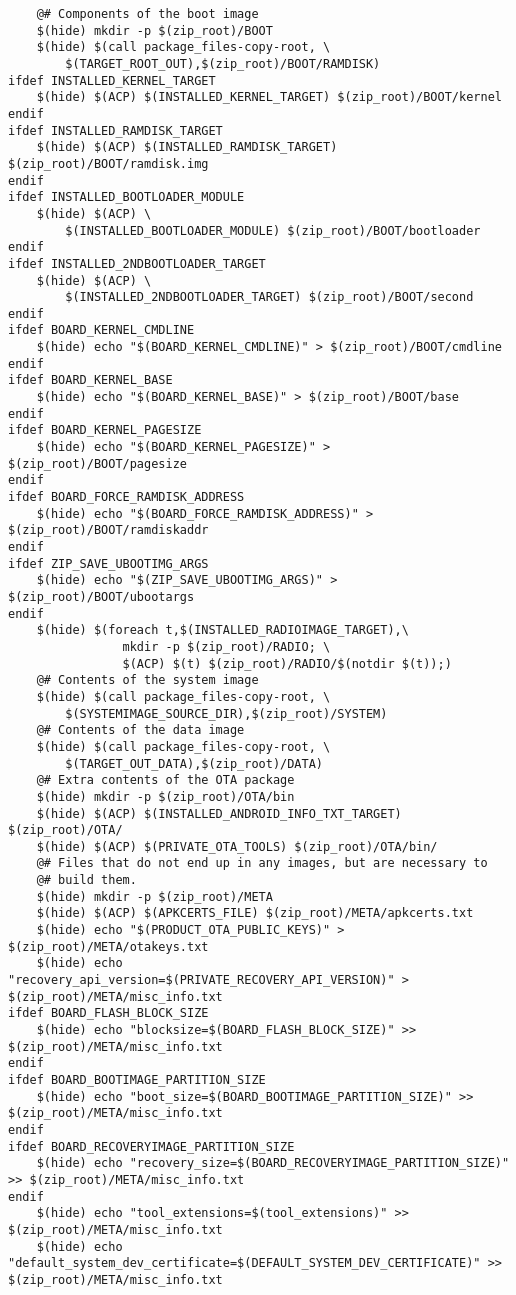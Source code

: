 \documentclass[12pt,a4paper]{article}
\begin{document}
\begin{verbatim}
	@# Components of the boot image
	$(hide) mkdir -p $(zip_root)/BOOT
	$(hide) $(call package_files-copy-root, \
		$(TARGET_ROOT_OUT),$(zip_root)/BOOT/RAMDISK)
ifdef INSTALLED_KERNEL_TARGET
	$(hide) $(ACP) $(INSTALLED_KERNEL_TARGET) $(zip_root)/BOOT/kernel
endif
ifdef INSTALLED_RAMDISK_TARGET
	$(hide) $(ACP) $(INSTALLED_RAMDISK_TARGET) $(zip_root)/BOOT/ramdisk.img
endif
ifdef INSTALLED_BOOTLOADER_MODULE
	$(hide) $(ACP) \
		$(INSTALLED_BOOTLOADER_MODULE) $(zip_root)/BOOT/bootloader
endif
ifdef INSTALLED_2NDBOOTLOADER_TARGET
	$(hide) $(ACP) \
		$(INSTALLED_2NDBOOTLOADER_TARGET) $(zip_root)/BOOT/second
endif
ifdef BOARD_KERNEL_CMDLINE
	$(hide) echo "$(BOARD_KERNEL_CMDLINE)" > $(zip_root)/BOOT/cmdline
endif
ifdef BOARD_KERNEL_BASE
	$(hide) echo "$(BOARD_KERNEL_BASE)" > $(zip_root)/BOOT/base
endif
ifdef BOARD_KERNEL_PAGESIZE
	$(hide) echo "$(BOARD_KERNEL_PAGESIZE)" > $(zip_root)/BOOT/pagesize
endif
ifdef BOARD_FORCE_RAMDISK_ADDRESS
	$(hide) echo "$(BOARD_FORCE_RAMDISK_ADDRESS)" > $(zip_root)/BOOT/ramdiskaddr
endif
ifdef ZIP_SAVE_UBOOTIMG_ARGS
	$(hide) echo "$(ZIP_SAVE_UBOOTIMG_ARGS)" > $(zip_root)/BOOT/ubootargs
endif
	$(hide) $(foreach t,$(INSTALLED_RADIOIMAGE_TARGET),\
	            mkdir -p $(zip_root)/RADIO; \
	            $(ACP) $(t) $(zip_root)/RADIO/$(notdir $(t));)
	@# Contents of the system image
	$(hide) $(call package_files-copy-root, \
		$(SYSTEMIMAGE_SOURCE_DIR),$(zip_root)/SYSTEM)
	@# Contents of the data image
	$(hide) $(call package_files-copy-root, \
		$(TARGET_OUT_DATA),$(zip_root)/DATA)
	@# Extra contents of the OTA package
	$(hide) mkdir -p $(zip_root)/OTA/bin
	$(hide) $(ACP) $(INSTALLED_ANDROID_INFO_TXT_TARGET) $(zip_root)/OTA/
	$(hide) $(ACP) $(PRIVATE_OTA_TOOLS) $(zip_root)/OTA/bin/
	@# Files that do not end up in any images, but are necessary to
	@# build them.
	$(hide) mkdir -p $(zip_root)/META
	$(hide) $(ACP) $(APKCERTS_FILE) $(zip_root)/META/apkcerts.txt
	$(hide)	echo "$(PRODUCT_OTA_PUBLIC_KEYS)" > $(zip_root)/META/otakeys.txt
	$(hide) echo "recovery_api_version=$(PRIVATE_RECOVERY_API_VERSION)" > $(zip_root)/META/misc_info.txt
ifdef BOARD_FLASH_BLOCK_SIZE
	$(hide) echo "blocksize=$(BOARD_FLASH_BLOCK_SIZE)" >> $(zip_root)/META/misc_info.txt
endif
ifdef BOARD_BOOTIMAGE_PARTITION_SIZE
	$(hide) echo "boot_size=$(BOARD_BOOTIMAGE_PARTITION_SIZE)" >> $(zip_root)/META/misc_info.txt
endif
ifdef BOARD_RECOVERYIMAGE_PARTITION_SIZE
	$(hide) echo "recovery_size=$(BOARD_RECOVERYIMAGE_PARTITION_SIZE)" >> $(zip_root)/META/misc_info.txt
endif
	$(hide) echo "tool_extensions=$(tool_extensions)" >> $(zip_root)/META/misc_info.txt
	$(hide) echo "default_system_dev_certificate=$(DEFAULT_SYSTEM_DEV_CERTIFICATE)" >> $(zip_root)/META/misc_info.txt

\end{verbatim}
\end{document}
